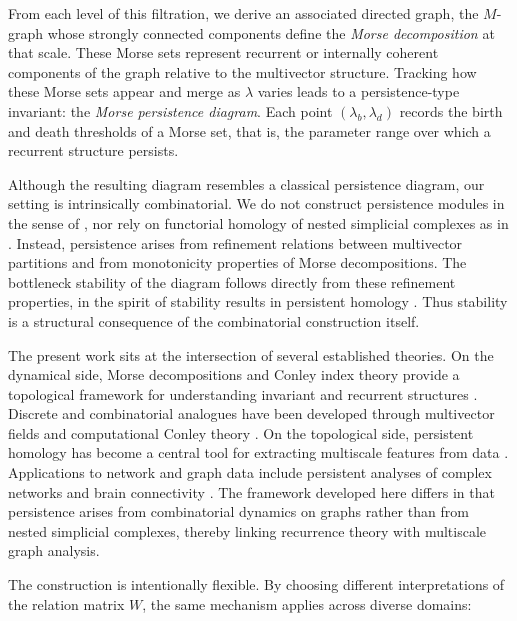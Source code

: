 \documentclass{article}
\theoremstyle{definition}
\theoremstyle{plain}
\theoremstyle{remark}
\newcommand{\1}{\mathbbm{1}}  %
\begin{document}
From each level of this filtration, we derive an associated directed
graph, the $M$-graph whose strongly connected components define the
\emph{Morse decomposition} at that scale.
These Morse sets represent recurrent or internally coherent components
of the graph relative to the multivector structure.
Tracking how these Morse sets appear and merge as $\lambda$ varies
leads to a persistence-type invariant:
the \emph{Morse persistence diagram}.
Each point $(\lambda_b,\lambda_d)$ records the birth and death thresholds
of a Morse set, that is, the parameter range over which a recurrent
structure persists.

Although the resulting diagram resembles a classical persistence
diagram, our setting is intrinsically combinatorial.
We do not construct persistence modules in the sense of
\cite{zomorodian2004computing}, nor rely on functorial homology of nested
simplicial complexes as in \cite{EdelsbrunnerHarer2010CT}.
Instead, persistence arises from refinement relations between
multivector partitions and from monotonicity properties of Morse
decompositions.
The bottleneck stability of the diagram follows directly from these
refinement properties, in the spirit of stability results in
persistent homology \cite{cohen2005stability,chazal2016structure}.
Thus stability is a structural consequence of the combinatorial
construction itself.

The present work sits at the intersection of several established
theories.
On the dynamical side, Morse decompositions and Conley index theory
provide a topological framework for understanding invariant and
recurrent structures \cite{conley1978isolated,mischaikow2002conley}.
Discrete and combinatorial analogues have been developed through
multivector fields and computational Conley theory
\cite{mrozek2017conley,kaczynski2004computational}.
On the topological side, persistent homology has become a central tool
for extracting multiscale features from data
\cite{EdelsbrunnerHarer2010CT}.
Applications to network and graph data include persistent analyses of
complex networks and brain connectivity
\cite{horak2009persistent,petri2014homological}.
The framework developed here differs in that persistence arises from
combinatorial dynamics on graphs rather than from nested simplicial
complexes, thereby linking recurrence theory with multiscale graph
analysis.

The construction is intentionally flexible.
By choosing different interpretations of the relation matrix $W$,
the same mechanism applies across diverse domains:
\end{document}
